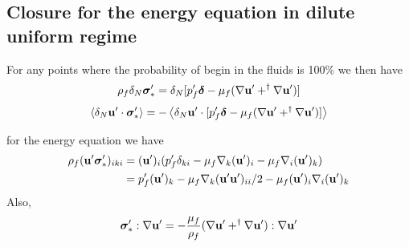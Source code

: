 \subsection{Closure for the energy equation in dilute uniform regime}

For any points where the probability of begin in the fluids is 100\% we then have 
\begin{equation}
    \rho_f \delta_N \bm\sigma_*'
    =
    \delta_N [p_f' \bm\delta
    - \mu_f (
        \mathbf{\nabla} \textbf{u}' 
        + ^\dagger \mathbf{\nabla} \textbf{u}' 
        )]
\end{equation}
\begin{equation}
    \left<\delta_N \textbf{u}'\cdot \bm\sigma_*'\right>
    =
    - \left<\delta_N \textbf{u}'\cdot [p_f' \bm\delta
    - \mu_f (
        \mathbf{\nabla} \textbf{u}' 
        + ^\dagger \mathbf{\nabla} \textbf{u}' 
        )]\right>
\end{equation}

for the energy equation we have
\begin{align*}
    \rho_f (\textbf{u}' \bm\sigma_*')_{iki}
    &=
    (\textbf{u}')_i (
        p_f' \delta_{ki}
    - \mu_f \mathbf{\nabla}_k (\textbf{u}')_i
    - \mu_f  \mathbf{\nabla}_i (\textbf{u}')_k
    )\\
    &= p_f'(\textbf{u}')_k  
    - \mu_f \mathbf{\nabla}_k (\textbf{u}'\textbf{u}')_{ii}/2
    - \mu_f (\textbf{u}')_i \mathbf{\nabla}_i (\textbf{u}')_k
    \\
\end{align*}
Also, 
\begin{equation}
    \bm\sigma_*' : \mathbf{\nabla} \textbf{u}'
    = 
    -\frac{\mu_f}{\rho_f}
    (\mathbf{\nabla} \textbf{u}'+ ^\dagger \mathbf{\nabla} \textbf{u}'): \mathbf{\nabla} \textbf{u}'
\end{equation}

